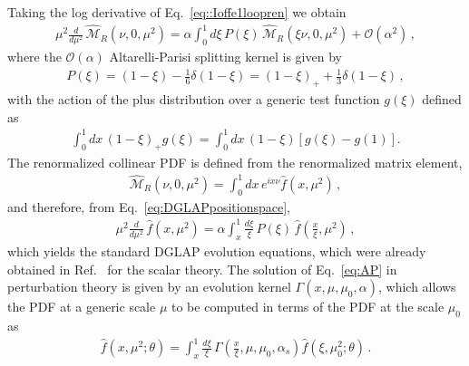 Taking the log derivative of Eq.~\eqref{eq::Ioffe1loopren} we obtain
\begin{align}
        \label{eq:DGLAPpositionspace}
        \mu^2\frac{d}{d\mu^2}\, \widehat{\mathcal{M}}_R\left(\nu,0,\mu^2\right) 
        = \alpha\int_0^1 d\xi\,P\left(\xi\right)\,\widehat{\mathcal{M}}_R\left(\xi\nu,0,\mu^2\right) 
        + \mathcal{O}\left(\alpha^2\right)\, ,
\end{align}
where the $\mathcal{O}\left(\alpha\right)$ Altarelli-Parisi splitting kernel is given by
\begin{align}
        \label{eq:AltarelliParisikernel}
        P\left(\xi\right) = 
        \left(1-\xi\right) - \frac{1}{6}\delta\left(1-\xi\right) = 
        \left(1-\xi\right)_+ + \frac{1}{3}\delta\left(1-\xi\right)\, ,
\end{align}
with the action of the plus distribution over a generic test function $g\left(\xi\right)$ defined as
\begin{align}
	\label{eq:plus}
	\int_0^1 dx\,\left(1-\xi\right)_+g\left(\xi\right) = \int_0^1 dx\,\left(1-\xi\right)\left[g\left(\xi\right) - g\left(1\right)\right].
\end{align}
The renormalized collinear PDF is defined from the renormalized matrix element,
\begin{align}
        \label{eq::PDFs}
        \widehat{\mathcal{M}}_R\left(\nu,0,\mu^2\right) = 
        \int_{0}^{1} dx \, e^{ix\nu}\widehat{f}\left(x,\mu^2\right)\, ,
\end{align}
and therefore, from Eq.~\eqref{eq:DGLAPpositionspace},
\begin{align}
        \label{eq:AP}
        \mu^2\frac{d}{d\mu^2}\, \widehat{f}\left(x, \mu^2\right) = 
        \alpha \int_{x}^{1} \frac{d\xi}{\xi}\,P\left(\xi\right)\,\widehat{f}\left(\frac{x}{\xi}, \mu^2\right)\, ,
\end{align}
which yields the standard DGLAP evolution equations, which were already obtained
in Ref.~\cite{Collins:1980ui} for the scalar theory. The solution of
Eq.~\eqref{eq:AP} in perturbation theory is given by an evolution kernel
$\Gamma\left(x,\mu,\mu_0,\alpha\right)$, which allows the PDF at a generic scale
$\mu$ to be computed in terms of the PDF at the scale $\mu_0$ as
\begin{align}
        \label{eq:solutionDGLAP}
	\widehat{f}\left(x,\mu^2; \theta\right) = \int_x^1 \frac{d\xi}{\xi}\,\Gamma\left(\frac{x}{\xi},\mu,\mu_0,\alpha_s\right)
	\widehat{f}\left(\xi,\mu_0^2; \theta\right)\, .
\end{align}
%

